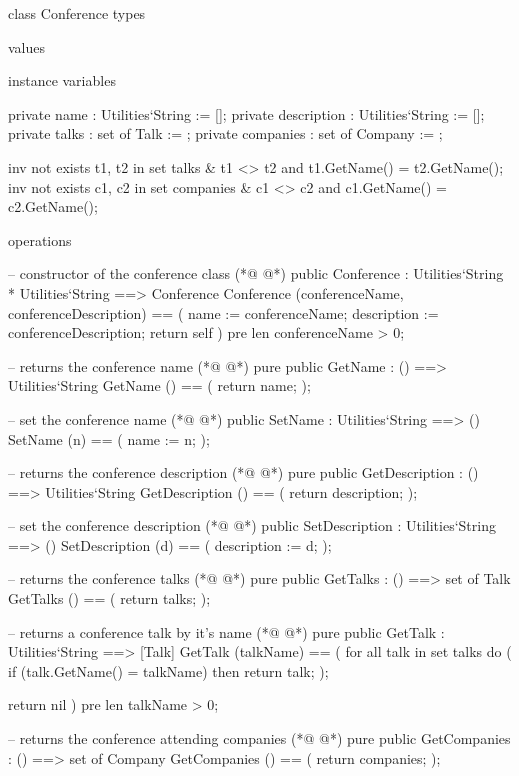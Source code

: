 \begin{vdmpp}[breaklines=true]
class Conference
types
 
values

instance variables

 private name : Utilities`String := [];
 private description : Utilities`String := [];
 private talks : set of Talk := {};
 private companies : set of Company := {};
 
 inv not exists t1, t2 in set talks & t1 <> t2 and t1.GetName() = t2.GetName();
 inv not exists c1, c2 in set companies & c1 <> c2 and c1.GetName() = c2.GetName();
 
operations
  
   -- constructor of the conference class 
(*@
\label{Conference:19}
@*)
  public Conference : Utilities`String * Utilities`String ==> Conference
    Conference (conferenceName, conferenceDescription) == (
     name := conferenceName;
     description := conferenceDescription;
     return self
    )
    pre len conferenceName > 0;
    
  -- returns the conference name
(*@
\label{GetName:28}
@*)
  pure public GetName : () ==> Utilities`String
    GetName () == (
     return name;
    );
    
 -- set the conference name
(*@
\label{SetName:34}
@*)
  public SetName : Utilities`String ==> ()
    SetName (n) == (
     name := n;
    );
    
  -- returns the conference description
(*@
\label{GetDescription:40}
@*)
  pure public GetDescription : () ==> Utilities`String
    GetDescription () == (
     return description;
    );
    
  -- set the conference description
(*@
\label{SetDescription:46}
@*)
  public SetDescription : Utilities`String ==> ()
    SetDescription (d) == (
     description := d;
    );
    
  -- returns the conference talks
(*@
\label{GetTalks:52}
@*)
  pure public GetTalks : () ==> set of Talk
    GetTalks () == (
     return talks;
    );
    
   -- returns a conference talk by it's name
(*@
\label{GetTalk:58}
@*)
  pure public GetTalk : Utilities`String ==> [Talk]
    GetTalk (talkName) == (
     for all talk in set talks do (
      if (talk.GetName() = talkName)
      then return talk;
     );
     
     return nil
    )
    pre len talkName > 0;
  
   -- returns the conference attending companies
(*@
\label{GetCompanies:70}
@*)
  pure public GetCompanies : () ==> set of Company
    GetCompanies () == (
     return companies;
    );
    

\end{vdmpp}
